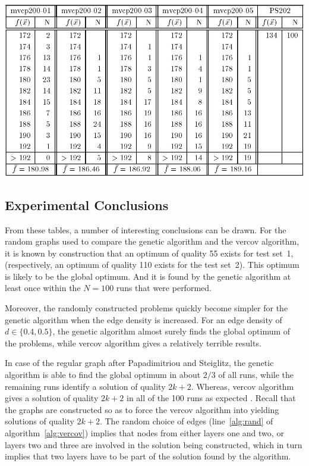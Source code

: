\documentclass[12pt]{article}
\begin{document}
\begin{table}[!htbp]
\centering
\includegraphics[width=1\textwidth]{t4}
\caption[Results obtained by vercov algorithm for graphs in test set~2]{%
Experimental results obtained by the vercov algorithm for five random graphs of size $n = 200$ with edge density: $d = 0.1$ (``mvcp200-01''), $d = 0.2$ (``mvcp200-02''), $d = 0.3$ (``mvcp200-03''), $d = 0.5$ (``mvcp200-04''), $d = 0.5$ (``mvcp200-05'') and the regular graph of size $n = 202 \ (k=66)$ from Papadimitriou and Steiglitz (``PS202'').%
}
\label{tbl:t4}
\end{table}


\subsection{Experimental Conclusions}
From these tables, a number of interesting conclusions
can be drawn.
For the random graphs used to compare the
genetic algorithm and the vercov algorithm,
it is known by construction that an optimum of
quality 55 exists for test set~1,
(respectively, an optimum of quality 110 exists
for the test set~2).
This optimum is likely to be the global optimum.
And it is found by the genetic algorithm at least once
within the $N = 100$ runs that were performed.

Moreover, the randomly constructed problems quickly
become simpler for the genetic algorithm when the edge
density is increased.
For an edge density of $d \in \{0.4, 0.5\}$, the
genetic algorithm almost surely finds the global optimum
of the problems, while vercov algorithm gives
a relatively terrible results.

In case of the regular graph after Papadimitriou and
Steiglitz, the genetic algorithm is able to find the global
optimum in about $2/3$ of all runs, while the remaining
runs identify a solution of quality $2k + 2$.
Whereas, vercov algorithm gives a solution of
quality $2k + 2$ in all of the 100 runs as expected \cite{10:mvcp}.
Recall that the graphs are constructed
so as to force the vercov algorithm into yielding solutions
of quality $2k + 2$.
The random choice of edges (line~\ref{alg:rand} of algorithm~\ref{alg:vercov})
implies that nodes from either layers one and two, or layers two and three
are involved in the solution being constructed,
which in turn implies that two layers have to be part of the solution
found by the algorithm.
\end{document}

